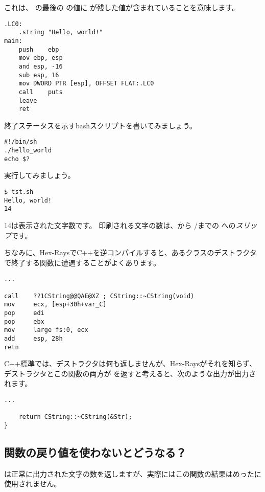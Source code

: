 これは、 \main の最後の \EAX の値に \puts が残した値が含まれていることを意味します。

\begin{lstlisting}[caption=GCC 4.8.1,style=customasmx86]
.LC0:
	.string	"Hello, world!"
main:
	push	ebp
	mov	ebp, esp
	and	esp, -16
	sub	esp, 16
	mov	DWORD PTR [esp], OFFSET FLAT:.LC0
	call	puts
	leave
	ret
\end{lstlisting}


終了ステータスを示すbashスクリプトを書いてみましょう。

\begin{lstlisting}[caption=tst.sh]
#!/bin/sh
./hello_world
echo $?
\end{lstlisting}

実行してみましょう。

\begin{lstlisting}
$ tst.sh 
Hello, world!
14
\end{lstlisting}

14は表示された文字数です。
印刷される文字の数は、\printf から /までの への\textit{スリップ}です。

ちなみに、Hex-RaysでC++を逆コンパイルすると、あるクラスのデストラクタで終了する関数に遭遇することがよくあります。

\begin{lstlisting}[style=customasmx86]
...

call    ??1CString@@QAE@XZ ; CString::~CString(void)
mov     ecx, [esp+30h+var_C]
pop     edi
pop     ebx
mov     large fs:0, ecx
add     esp, 28h
retn
\end{lstlisting}

C++標準では、デストラクタは何も返しませんが、Hex-Raysがそれを知らず、
デストラクタとこの関数の両方が \Tint を返すと考えると、次のような出力が出力されます。

\begin{lstlisting}[style=customc]
...

	return CString::~CString(&Str);
}
\end{lstlisting}

\subsection{関数の戻り値を使わないとどうなる？}

\printf は正常に出力された文字の数を返しますが、実際にはこの関数の結果はめったに使用されません。

